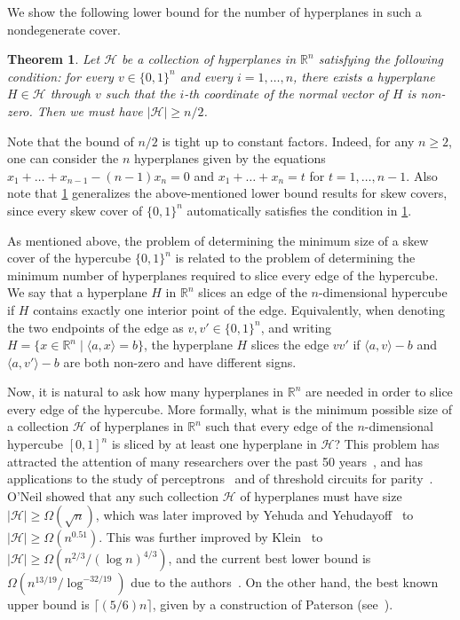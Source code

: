 \documentclass{amsart}
\newtheorem{theorem}{Theorem}
\theoremstyle{remark}
\numberwithin{theorem}{section}
\renewcommand{\(}{\bigl(}
\renewcommand{\)}{\bigr)\vphantom{)}}
\newcommand{\cH}{\mathcal H}
\renewcommand{\ge}{\geqslant}
\newcommand{\R}{\mathbb R}
\newcommand{\ang}[1]{\langle#1\rangle}
\newcommand{\bin}{\{0,1\}}
\begin{document}
We show the following lower bound for the number of hyperplanes in such a nondegenerate cover.

\begin{theorem}\label{thm:main}
    Let $\cH$ be a collection of hyperplanes in $\R^n$ satisfying the following condition: for every $v\in \bin^n$ and every $i=1,\dots,n$, there exists a hyperplane $H\in \mathcal{H}$ through $v$ such that the $i$-th coordinate of the normal vector of $H$ is non-zero. Then we must have $|\cH|\ge n/2$.
\end{theorem}


Note that the bound of $n/2$ is tight up to constant factors. Indeed, for any $n\ge 2$, one can consider the $n$ hyperplanes given by the equations $x_1+\dots+x_{n-1}-(n-1)x_n=0$ and $x_1+\dots+x_n=t$ for $t=1,\dots,n-1$. Also note that \cref{thm:main} generalizes the above-mentioned lower bound results for skew covers, since every skew cover of $ \bin^n$ automatically satisfies the condition in \cref{thm:main}.



As mentioned above, the problem of determining the minimum size of a skew cover of the hypercube $\bin^n$ is related to the problem of determining the minimum number of hyperplanes required to slice every edge of the hypercube. We say that a hyperplane $H$ in $\R^n$ slices an edge of the $n$-dimensional hypercube if $H$ contains exactly one interior point of the edge. Equivalently, when denoting the two endpoints of the edge as $v,v'\in \bin^n$, and writing $H = \{x\in \R^n\mid \ang{a,x} = b \}$, the hyperplane $H$ slices the edge $vv'$ if $\ang{a,v} - b$ and $\ang{a,v'} - b$ are both non-zero and have different signs.


Now, it is natural to ask how many hyperplanes in $\R^n$ are needed in order to slice every edge of the hypercube. More formally, what is the minimum possible size of a collection $\cH$ of hyperplanes in $\R^n$ such that every edge of the $n$-dimensional hypercube $[0,1]^n$ is sliced by at least one hyperplane in $\cH$? This problem has attracted the attention of many researchers over the past 50 years~\cite{AHLSWEDE1990137,alon88balance,EmamyKhansary86,GotsmanLinial94,grunbaum72,klein2022slicing,ONeil71,paturi1990threshold,saks1993,yehuda2021slicing}, and has applications to the study of perceptrons~\cite{ONeil71} and of threshold circuits for parity~\cite{paturi1990threshold,yehuda2021slicing}.  O'Neil showed that any  such collection $\cH$ of hyperplanes must have size $|\cH|\ge \Omega(\sqrt{n})$, which was later improved by Yehuda and Yehudayoff~\cite{yehuda2021slicing} to $|\cH|\ge \Omega(n^{0.51})$. This was further improved by Klein~\cite{klein2022slicing} to $|\cH|\ge \Omega(n^{2/3}/(\log n)^{4/3})$, and the current best lower bound is $\Omega(n^{13/19}/\log^{-32/19})$ due to the authors~\cite{sauermann2025improvedlowerboundhypercube}. On the other hand, the best known upper bound is $\lceil (5/6)n\rceil$, given by a construction of Paterson (see~\cite{saks1993}).
\end{document}
